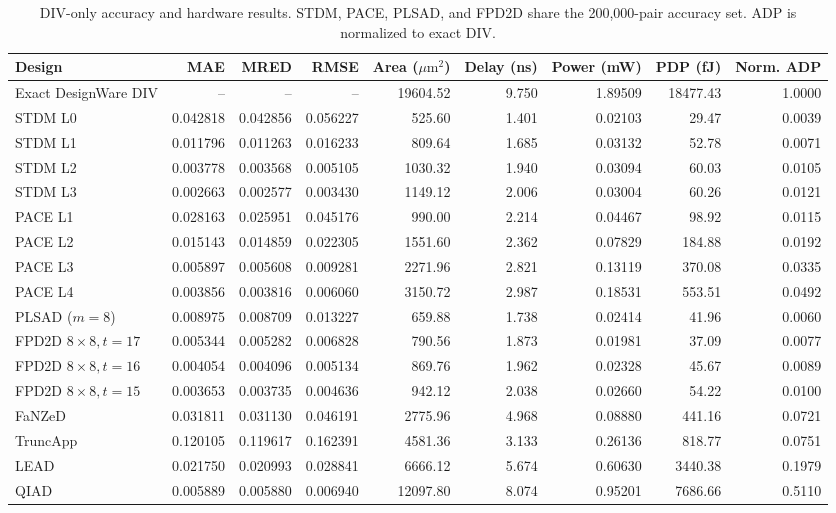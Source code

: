 \documentclass[conference]{IEEEtran}
\newcommand{\um}{\ensuremath{\mu\mathrm{m}^2}}
\begin{document}
\begin{table}[!t]
\centering\footnotesize
\renewcommand{\arraystretch}{1.15}
\caption{DIV-only accuracy and hardware results. STDM, PACE, PLSAD, and FPD2D
share the 200,000-pair accuracy set. ADP is normalized to exact DIV.}
\label{tab:div}
\setlength{\tabcolsep}{3pt}
\begin{tabular}{lrrrrrrrr}
\toprule
Design & MAE & MRED & RMSE & Area (\um) & Delay (ns) & Power (mW) & PDP (fJ) & Norm. ADP\\
\midrule
Exact DesignWare DIV & -- & -- & -- & 19604.52 & 9.750 & 1.89509 & 18477.43 & 1.0000\\
\midrule
STDM L0 & 0.042818 & 0.042856 & 0.056227 & 525.60 & 1.401 & 0.02103 & 29.47 & 0.0039\\
STDM L1 & 0.011796 & 0.011263 & 0.016233 & 809.64 & 1.685 & 0.03132 & 52.78 & 0.0071\\
STDM L2 & 0.003778 & 0.003568 & 0.005105 & 1030.32 & 1.940 & 0.03094 & 60.03 & 0.0105\\
STDM L3 & 0.002663 & 0.002577 & 0.003430 & 1149.12 & 2.006 & 0.03004 & 60.26 & 0.0121\\
\midrule
PACE L1 & 0.028163 & 0.025951 & 0.045176 & 990.00 & 2.214 & 0.04467 & 98.92 & 0.0115\\
PACE L2 & 0.015143 & 0.014859 & 0.022305 & 1551.60 & 2.362 & 0.07829 & 184.88 & 0.0192\\
PACE L3 & 0.005897 & 0.005608 & 0.009281 & 2271.96 & 2.821 & 0.13119 & 370.08 & 0.0335\\
PACE L4 & 0.003856 & 0.003816 & 0.006060 & 3150.72 & 2.987 & 0.18531 & 553.51 & 0.0492\\
\midrule
PLSAD ($m=8$) & 0.008975 & 0.008709 & 0.013227 & 659.88 & 1.738 & 0.02414 & 41.96 & 0.0060\\
FPD2D $8\times8,t=17$ & 0.005344 & 0.005282 & 0.006828 & 790.56 & 1.873 & 0.01981 & 37.09 & 0.0077\\
FPD2D $8\times8,t=16$ & 0.004054 & 0.004096 & 0.005134 & 869.76 & 1.962 & 0.02328 & 45.67 & 0.0089\\
FPD2D $8\times8,t=15$ & 0.003653 & 0.003735 & 0.004636 & 942.12 & 2.038 & 0.02660 & 54.22 & 0.0100\\
\midrule
FaNZeD & 0.031811 & 0.031130 & 0.046191 & 2775.96 & 4.968 & 0.08880 & 441.16 & 0.0721\\
TruncApp & 0.120105 & 0.119617 & 0.162391 & 4581.36 & 3.133 & 0.26136 & 818.77 & 0.0751\\
LEAD & 0.021750 & 0.020993 & 0.028841 & 6666.12 & 5.674 & 0.60630 & 3440.38 & 0.1979\\
QIAD & 0.005889 & 0.005880 & 0.006940 & 12097.80 & 8.074 & 0.95201 & 7686.66 & 0.5110\\
\bottomrule
\end{tabular}
\end{table}
\end{document}
